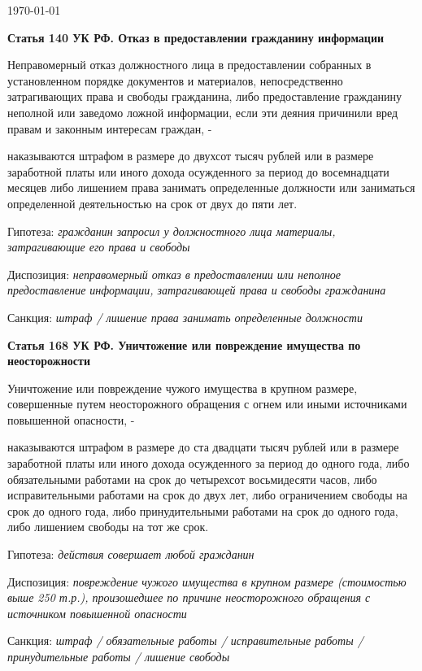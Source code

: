 \documentclass[a4paper, 11pt]{article}
\begin{document}
 \hfill {\today}

\noindent\textbf{Статья 140 УК РФ. Отказ в предоставлении гражданину информации}

Неправомерный отказ должностного лица в предоставлении собранных в установленном порядке документов и материалов, непосредственно затрагивающих права и свободы гражданина, либо предоставление гражданину неполной или заведомо ложной информации, если эти деяния причинили вред правам и законным интересам граждан, -

наказываются штрафом в размере до двухсот тысяч рублей или в размере заработной платы или иного дохода осужденного за период до восемнадцати месяцев либо лишением права занимать определенные должности или заниматься определенной деятельностью на срок от двух до пяти лет.

\par\noindent Гипотеза: \textit{гражданин запросил у должностного лица материалы, затрагивающие его права и свободы }
\par\noindent Диспозиция: \textit{неправомерный отказ в предоставлении или неполное предоставление информации, затрагивающей права и свободы гражданина }
\par\noindent Санкция: \textit{штраф / лишение права занимать определенные должности }

\vskip10pt

\noindent\textbf{Статья 168 УК РФ. Уничтожение или повреждение имущества по неосторожности}

Уничтожение или повреждение чужого имущества в крупном размере, совершенные путем неосторожного обращения с огнем или иными источниками повышенной опасности, -

наказываются штрафом в размере до ста двадцати тысяч рублей или в размере заработной платы или иного дохода осужденного за период до одного года, либо обязательными работами на срок до четырехсот восьмидесяти часов, либо исправительными работами на срок до двух лет, либо ограничением свободы на срок до одного года, либо принудительными работами на срок до одного года, либо лишением свободы на тот же срок.

\par\noindent Гипотеза: \textit{действия совершает любой гражданин}
\par\noindent Диспозиция: \textit{повреждение чужого имущества в крупном размере (стоимостью выше 250 т.р.), произошедшее по причине неосторожного обращения с источником повышенной опасности }
\par\noindent Санкция: \textit{штраф / обязательные работы / исправительные работы / принудительные работы / лишение свободы }
\end{document}

